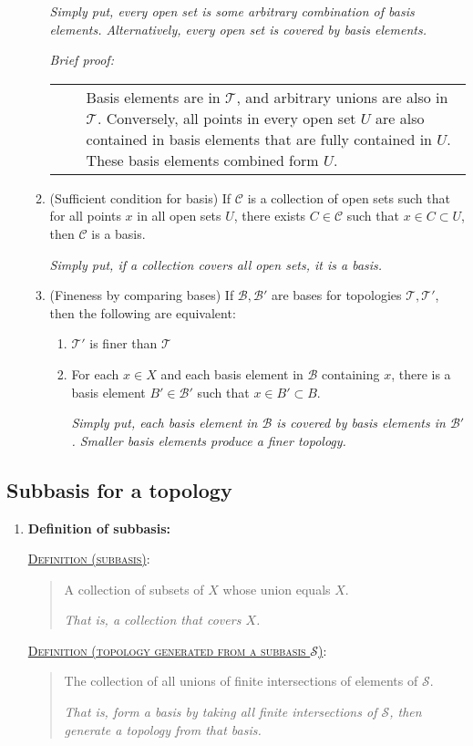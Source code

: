 \documentclass[letterpaper, 12pt]{article}
\newcommand{\ms}[1]{\mathscr{#1}}
\newcommand{\defn}[2]{\textsc{\underline{Definition (#1)}:}\begin{quote} #2\end{quote}}
\newenvironment{briefproof}{\footnotesize\begin{flushleft}\textit{Brief proof:}\par\begin{tabular}{l|p{0.8\textwidth}}$\quad$&}{\\
\end{tabular}\end{flushleft}}
\begin{document}
\begin{enumerate}[resume]
\begin{enumerate}
        \textit{Simply put, every open set is some arbitrary combination of basis elements. Alternatively, every open set is covered by basis elements.}
        \begin{briefproof}
        Basis elements are in $\ms{T}$, and arbitrary unions are also in $\ms{T}$. Conversely, all points in every open set $U$ are also contained in basis elements that are fully contained in $U$. These basis elements combined form $U$.
        \end{briefproof}

        \item (Sufficient condition for basis) If $\ms{C}$ is a collection of open sets such that for all points $x$ in all open sets $U$, there exists $C\in\ms{C}$ such that $x\in C\subset U$, then $\ms{C}$ is a basis.

        \textit{Simply put, if a collection covers all open sets, it is a basis.}

        \item (Fineness by comparing bases) If $\ms{B}, \ms{B'}$ are bases for topologies $\ms{T}, \ms{T'}$, then the following are equivalent:
        \begin{enumerate}
        \item $\ms{T'}$ is finer than $\ms{T}$
        \item For each $x\in X$ and each basis element in $\ms{B}$ containing $x$, there is a basis element $B'\in\ms{B'}$ such that $x\in B' \subset B$.

        \textit{Simply put, each basis element in $\ms{B}$ is covered by basis elements in $\ms{B'}$. Smaller basis elements produce a finer topology.}
        \end{enumerate}
        \end{enumerate}
        \end{enumerate}
    \subsection{Subbasis for a topology}
        \begin{enumerate}[resume]
        \item \textbf{Definition of subbasis:}

        \defn{subbasis}{A collection of subsets of $X$ whose union equals $X$.\par\textit{That is, a collection that covers $X$.}}
        \defn{topology generated from a subbasis $\ms{S}$}{The collection of all unions of finite intersections of elements of $\ms{S}$.\par\textit{That is, form a basis by taking all finite intersections of $\ms{S}$, then generate a topology from that basis.}}
        \end{enumerate}
\end{document}
